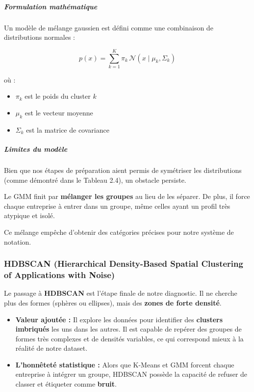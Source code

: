 \subparagraph{Formulation mathématique}

Un modèle de mélange gaussien est défini comme une combinaison de distributions normales :

\begin{equation}
p(x) = \sum_{k=1}^{K} \pi_k \, \mathcal{N}(x \mid \mu_k, \Sigma_k)
\end{equation}

où :
\begin{itemize}
    \item $\pi_k$ est le poids du cluster $k$
    \item $\mu_k$ est le vecteur moyenne
    \item $\Sigma_k$ est la matrice de covariance
\end{itemize}

\subparagraph{Limites du modèle}

Bien que nos étapes de préparation aient permis de symétriser les distributions (comme démontré dans le Tableau 2.4), un obstacle persiste.

Le GMM finit par \textbf{mélanger les groupes} au lieu de les séparer. De plus, il force chaque entreprise à entrer dans un groupe, même celles ayant un profil très atypique et isolé.

Ce mélange empêche d'obtenir des catégories précises pour notre système de notation.\cite{reynolds2009gmm} \cite{sklearn_gmm}
\subsubsection{HDBSCAN (Hierarchical Density-Based Spatial Clustering of Applications with Noise)}

Le passage à \textbf{HDBSCAN} est l’étape finale de notre diagnostic. Il ne cherche plus des formes (sphères ou ellipses), mais des \textbf{zones de forte densité}.

\begin{itemize}
    \item \textbf{Valeur ajoutée :} Il explore les données pour identifier des \textbf{clusters imbriqués} les uns dans les autres. Il est capable de repérer des groupes de formes très complexes et de densités variables, ce qui correspond mieux à la réalité de notre dataset.
    
    \item \textbf{L’honnêteté statistique :} Alors que K-Means et GMM forcent chaque entreprise à intégrer un groupe, HDBSCAN possède la capacité de refuser de classer et étiqueter comme \textbf{bruit}.\cite{campello2013hdbscan}
\end{itemize}

